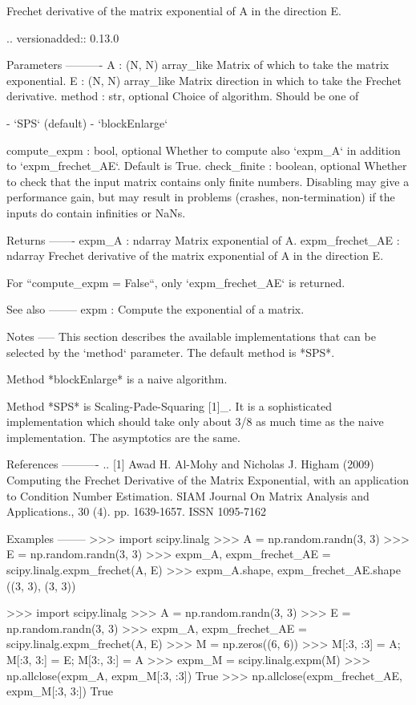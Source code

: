 \begin{DoxyVerb}Frechet derivative of the matrix exponential of A in the direction E.

.. versionadded:: 0.13.0

Parameters
----------
A : (N, N) array_like
    Matrix of which to take the matrix exponential.
E : (N, N) array_like
    Matrix direction in which to take the Frechet derivative.
method : str, optional
    Choice of algorithm.  Should be one of

    - `SPS` (default)
    - `blockEnlarge`

compute_expm : bool, optional
    Whether to compute also `expm_A` in addition to `expm_frechet_AE`.
    Default is True.
check_finite : boolean, optional
    Whether to check that the input matrix contains only finite numbers.
    Disabling may give a performance gain, but may result in problems
    (crashes, non-termination) if the inputs do contain infinities or NaNs.

Returns
-------
expm_A : ndarray
    Matrix exponential of A.
expm_frechet_AE : ndarray
    Frechet derivative of the matrix exponential of A in the direction E.

For ``compute_expm = False``, only `expm_frechet_AE` is returned.

See also
--------
expm : Compute the exponential of a matrix.

Notes
-----
This section describes the available implementations that can be selected
by the `method` parameter. The default method is *SPS*.

Method *blockEnlarge* is a naive algorithm.

Method *SPS* is Scaling-Pade-Squaring [1]_.
It is a sophisticated implementation which should take
only about 3/8 as much time as the naive implementation.
The asymptotics are the same.

References
----------
.. [1] Awad H. Al-Mohy and Nicholas J. Higham (2009)
       Computing the Frechet Derivative of the Matrix Exponential,
       with an application to Condition Number Estimation.
       SIAM Journal On Matrix Analysis and Applications.,
       30 (4). pp. 1639-1657. ISSN 1095-7162

Examples
--------
>>> import scipy.linalg
>>> A = np.random.randn(3, 3)
>>> E = np.random.randn(3, 3)
>>> expm_A, expm_frechet_AE = scipy.linalg.expm_frechet(A, E)
>>> expm_A.shape, expm_frechet_AE.shape
((3, 3), (3, 3))

>>> import scipy.linalg
>>> A = np.random.randn(3, 3)
>>> E = np.random.randn(3, 3)
>>> expm_A, expm_frechet_AE = scipy.linalg.expm_frechet(A, E)
>>> M = np.zeros((6, 6))
>>> M[:3, :3] = A; M[:3, 3:] = E; M[3:, 3:] = A
>>> expm_M = scipy.linalg.expm(M)
>>> np.allclose(expm_A, expm_M[:3, :3])
True
>>> np.allclose(expm_frechet_AE, expm_M[:3, 3:])
True\end{DoxyVerb}
 \hypertarget{namespacescipy_1_1linalg_1_1__expm__frechet_ad55eaf8fe8d5bc6873d6d14b2bd15894}{}
